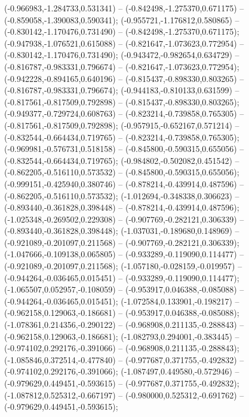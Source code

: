  (-0.966983,-1.284733,0.531341) -- (-0.842498,-1.275370,0.671175) -- (-0.859058,-1.390083,0.590341);
 (-0.955721,-1.176812,0.580865) -- (-0.830142,-1.170476,0.731490) -- (-0.842498,-1.275370,0.671175);
 (-0.947938,-1.076521,0.615088) -- (-0.821647,-1.073623,0.772954) -- (-0.830142,-1.170476,0.731490);
 (-0.943472,-0.982654,0.634729) -- (-0.816787,-0.983331,0.796674) -- (-0.821647,-1.073623,0.772954);
 (-0.942228,-0.894165,0.640196) -- (-0.815437,-0.898330,0.803265) -- (-0.816787,-0.983331,0.796674);
 (-0.944183,-0.810133,0.631599) -- (-0.817561,-0.817509,0.792898) -- (-0.815437,-0.898330,0.803265);
 (-0.949377,-0.729724,0.608763) -- (-0.823214,-0.739858,0.765305) -- (-0.817561,-0.817509,0.792898);
 (-0.957915,-0.652167,0.571214) -- (-0.832544,-0.664434,0.719765) -- (-0.823214,-0.739858,0.765305);
 (-0.969981,-0.576731,0.518158) -- (-0.845800,-0.590315,0.655056) -- (-0.832544,-0.664434,0.719765);
 (-0.984802,-0.502082,0.451542) -- (-0.862205,-0.516110,0.573532) -- (-0.845800,-0.590315,0.655056);
 (-0.999151,-0.425940,0.380746) -- (-0.878214,-0.439914,0.487596) -- (-0.862205,-0.516110,0.573532);
 (-1.012694,-0.348338,0.306623) -- (-0.893440,-0.361828,0.398448) -- (-0.878214,-0.439914,0.487596);
 (-1.025348,-0.269502,0.229308) -- (-0.907769,-0.282121,0.306339) -- (-0.893440,-0.361828,0.398448);
 (-1.037031,-0.189680,0.148969) -- (-0.921089,-0.201097,0.211568) -- (-0.907769,-0.282121,0.306339);
 (-1.047666,-0.109138,0.065805) -- (-0.933289,-0.119090,0.114477) -- (-0.921089,-0.201097,0.211568);
 (-1.057180,-0.028159,-0.019957) -- (-0.944264,-0.036465,0.015451) -- (-0.933289,-0.119090,0.114477);
 (-1.065507,0.052957,-0.108059) -- (-0.953917,0.046388,-0.085088) -- (-0.944264,-0.036465,0.015451);
 (-1.072584,0.133901,-0.198217) -- (-0.962158,0.129063,-0.186681) -- (-0.953917,0.046388,-0.085088);
 (-1.078361,0.214356,-0.290122) -- (-0.968908,0.211135,-0.288843) -- (-0.962158,0.129063,-0.186681);
 (-1.082793,0.294001,-0.383445) -- (-0.974102,0.292176,-0.391066) -- (-0.968908,0.211135,-0.288843);
 (-1.085846,0.372514,-0.477840) -- (-0.977687,0.371755,-0.492832) -- (-0.974102,0.292176,-0.391066);
 (-1.087497,0.449580,-0.572946) -- (-0.979629,0.449451,-0.593615) -- (-0.977687,0.371755,-0.492832);
 (-1.087812,0.525312,-0.667197) -- (-0.980000,0.525312,-0.691762) -- (-0.979629,0.449451,-0.593615);
